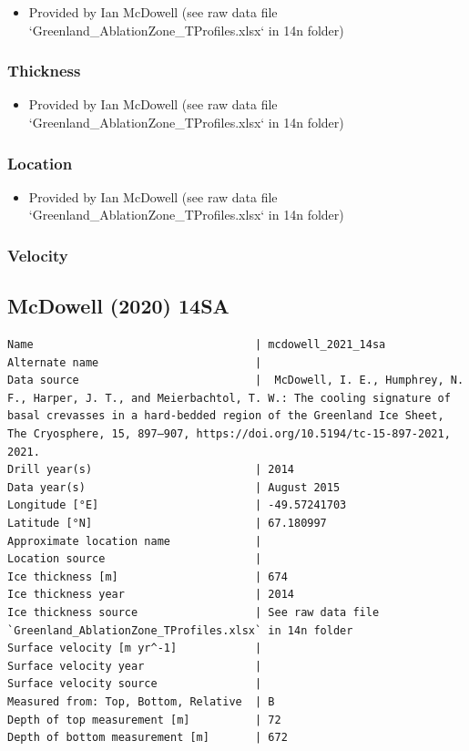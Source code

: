 \documentclass[article,a4paper,times,11pt,twoside]{article}
\begin{document}
\begin{itemize}
\item Provided by Ian McDowell (see raw data file `Greenland\_AblationZone\_TProfiles.xlsx` in 14n folder)
\end{itemize}

\subsubsection{Thickness}
\label{sec:orgc8af5e4}

\begin{itemize}
\item Provided by Ian McDowell (see raw data file `Greenland\_AblationZone\_TProfiles.xlsx` in 14n folder)
\end{itemize}

\subsubsection{Location}
\label{sec:org5a70213}

\begin{itemize}
\item Provided by Ian McDowell (see raw data file `Greenland\_AblationZone\_TProfiles.xlsx` in 14n folder)
\end{itemize}

\subsubsection{Velocity}
\label{sec:org651079d}
\clearpage
\subsection{McDowell (2020) 14SA}
\label{sec:org500c300}
\begin{verbatim}
Name                                  | mcdowell_2021_14sa
Alternate name                        | 
Data source                           |  McDowell, I. E., Humphrey, N. F., Harper, J. T., and Meierbachtol, T. W.: The cooling signature of basal crevasses in a hard-bedded region of the Greenland Ice Sheet, The Cryosphere, 15, 897–907, https://doi.org/10.5194/tc-15-897-2021, 2021.
Drill year(s)                         | 2014
Data year(s)                          | August 2015
Longitude [°E]                        | -49.57241703
Latitude [°N]                         | 67.180997
Approximate location name             | 
Location source                       | 
Ice thickness [m]                     | 674
Ice thickness year                    | 2014
Ice thickness source                  | See raw data file `Greenland_AblationZone_TProfiles.xlsx` in 14n folder
Surface velocity [m yr^-1]            | 
Surface velocity year                 | 
Surface velocity source               | 
Measured from: Top, Bottom, Relative  | B
Depth of top measurement [m]          | 72
Depth of bottom measurement [m]       | 672
\end{verbatim}
\end{document}
